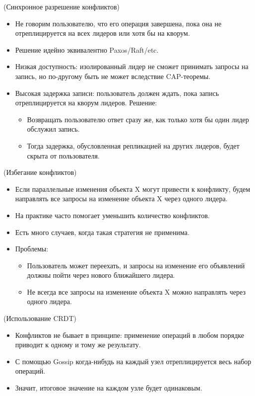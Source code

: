 \begin{algorithm}(Синхронное разрешение конфликтов)
    \begin{itemize}
        \item Не говорим пользователю, что его операция завершена, пока она не отреплицируется на всех лидеров или хотя бы на кворум.
        \item Решение идейно эквивалентно Paxos/Raft/etc.
        \item Низкая доступность: изолированный лидер не сможет принимать запросы на запись, но по-другому быть не может вследствие CAP-теоремы.

        \item Высокая задержка записи: пользователь должен ждать, пока запись отреплицируется на кворум лидеров. Решение:
        \begin{itemize}
            \item Возвращать пользователю ответ сразу же, как только хотя бы один лидер обслужил запись.
            \item Тогда задержка, обусловленная репликацией на других лидеров, будет скрыта от пользователя.
        \end{itemize}
    \end{itemize}

\end{algorithm}

\begin{algorithm}(Избегание конфликтов)
    \begin{itemize}
        \item Если параллельные изменения объекта X могут привести к конфликту, будем направлять все запросы на изменение объекта X через одного лидера.
        \item На практике часто помогает уменьшить количество конфликтов.
        \item Есть много случаев, когда такая стратегия не применима.
        \item Проблемы:
        \begin{itemize}
            \item Пользователь может переехать, и запросы на изменение его объявлений должны пойти через нового ближайшего лидера.
            \item Не всегда все запросы на изменение объекта X можно направлять через одного лидера.
        \end{itemize}
    \end{itemize}

\end{algorithm}

\begin{algorithm}(Использование CRDT)
    \begin{itemize}
        \item Конфликтов не бывает в принципе: применение операций в любом порядке приводит к одному и тому же результату.
        \item С помощью Gossip когда-нибудь на каждый узел отреплицируется весь набор операций.
        \item Значит, итоговое значение на каждом узле будет одинаковым.
    \end{itemize}

\end{algorithm}
